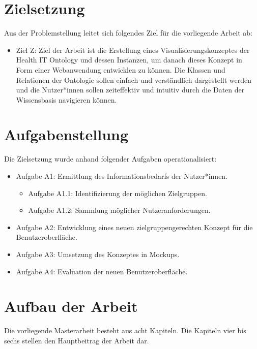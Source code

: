 \clearpage

\section{Zielsetzung}\label{sec:zielsetzung}

Aus der Problemstellung leitet sich folgendes Ziel für die vorliegende Arbeit ab:

\begin{itemize}
\item Ziel Z: Ziel der Arbeit ist die Erstellung eines Visualisierungskonzeptes der Health IT Ontology und dessen Instanzen, um danach dieses Konzept in Form einer Webanwendung entwicklen zu können.
Die Klassen und Relationen der Ontologie sollen einfach und verständlich dargestellt werden und die Nutzer*innen sollen zeiteffektiv und intuitiv durch die Daten der Wissensbasis navigieren können.
\end{itemize}

\section{Aufgabenstellung}\label{sec:aufgabenstellung}

Die Zielsetzung wurde anhand folgender Aufgaben operationalisiert:

\begin{itemize}
	\item Aufgabe A1: Ermittlung des Informationsbedarfs der Nutzer*innen.
		\begin{itemize}
		\item Aufgabe A1.1: Identifizierung der möglichen Zielgruppen.
		\item Aufgabe A1.2: Sammlung möglicher Nutzeranforderungen.
		\end{itemize}
	\item Aufgabe A2: Entwicklung eines neuen zielgruppengerechten Konzept für die Benutzeroberfläche.
	\item Aufgabe A3: Umsetzung des Konzeptes in Mockups.
	\item Aufgabe A4: Evaluation der neuen Benutzeroberfläche.
\end{itemize}

\section{Aufbau der Arbeit}\label{sec:aufbau}

Die vorliegende Masterarbeit besteht aus acht Kapiteln. Die Kapiteln vier bis sechs stellen den Hauptbeitrag der Arbeit dar. \newline

